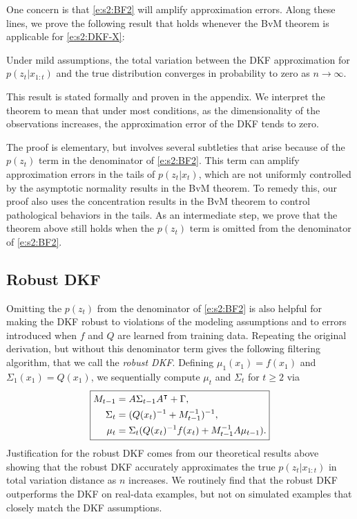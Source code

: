 One concern is that \eqref{e:s2:BF2} will amplify approximation errors. Along these lines, we prove the following result that holds whenever the BvM theorem is applicable for \eqref{e:s2:DKF-X}:
\begin{thm}
Under mild assumptions, the total variation between the DKF approximation for $p(z_t|x_{1:t})$ and the true distribution converges in probability to zero as $n\to\infty$.
\end{thm}
This result is stated formally and proven in the appendix.  We interpret the theorem to mean that under most conditions, as the dimensionality of the observations increases, the approximation error of the DKF tends to zero.

The proof is elementary, but involves several subtleties that arise because of the $p(z_t)$ term in the denominator of \eqref{e:s2:BF2}. This term can amplify approximation errors in the tails of $p(z_t|x_t)$, which are not uniformly controlled by the asymptotic normality results in the BvM theorem. To remedy this, our proof also uses the concentration results in the BvM theorem to control pathological behaviors in the tails. As an intermediate step, we prove that the theorem above still holds when the $p(z_t)$ term is omitted from the denominator of \eqref{e:s2:BF2}.

\subsection{Robust DKF} \label{s:robust} 

Omitting the $p(z_t)$ from the denominator of \eqref{e:s2:BF2} is also helpful for making the DKF robust to violations of the modeling assumptions and to errors introduced when $f$ and $Q$ are learned from training data. Repeating the original derivation, but without this denominator term gives the following filtering algorithm, that we call the {\em robust DKF}. 
Defining $\mu_1(x_1)=f(x_1)$ and $\Sigma_1(x_1)=Q(x_1)$, we sequentially compute $\mu_t$ and $\Sigma_t$ for $t\geq 2$ via
\begin{equation} 
\label{e:s2:rDKF} 
\boxed{
\begin{aligned}  
M_{t-1} &= A\Sigma_{t-1}A^\intercal+\Gamma , \\
\Sigma_t & = (Q(x_t)^{-1}+M_{t-1}^{-1})^{-1} ,  \\
\mu_t & = \Sigma_t(Q(x_t)^{-1}f(x_t) + M_{t-1}^{-1}A\mu_{t-1}) .
\end{aligned} 
}
\end{equation}
Justification for the robust DKF comes from our theoretical results above showing that the robust DKF accurately approximates the true $p(z_t|x_{1:t})$ in total variation distance as $n$ increases. We routinely find that the robust DKF outperforms the DKF on real-data examples, but not on simulated examples that closely match the DKF assumptions.   


